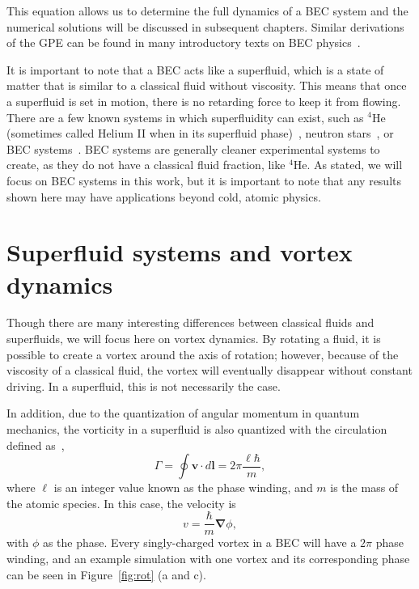 This equation allows us to determine the full dynamics of a BEC system and the numerical solutions will be discussed in subsequent chapters.
Similar derivations of the GPE can be found in many introductory texts on BEC physics~\cite{fetter2003, pethick2002, fetter2009}.

It is important to note that a BEC acts like a superfluid, which is a state of matter that is similar to a classical fluid without viscosity.
This means that once a superfluid is set in motion, there is no retarding force to keep it from flowing.
There are a few known systems in which superfluidity can exist, such as $^4$He (sometimes called Helium II when in its superfluid phase)~\cite{allen1938}, neutron stars~\cite{migdal1960}, or BEC systems~\cite{einstein1925, anderson1995}.
BEC systems are generally cleaner experimental systems to create, as they do not have a classical fluid fraction, like $^4$He.
As stated, we will focus on BEC systems in this work, but it is important to note that any results shown here may have applications beyond cold, atomic physics.

\section{Superfluid systems and vortex dynamics}

Though there are many interesting differences between classical fluids and superfluids, we will focus here on vortex dynamics.
By rotating a fluid, it is possible to create a vortex around the axis of rotation; however, because of the viscosity of a classical fluid, the vortex will eventually disappear without constant driving.
In a superfluid, this is not necessarily the case.

In addition, due to the quantization of angular momentum in quantum mechanics, the vorticity in a superfluid is also quantized with the circulation defined as~\cite{pethick2002},
\begin{equation}
\Gamma = \oint\mathbf{v} \cdot d \mathbf{l} = 2\pi \frac{\ell \hbar}{m},
\label{Eq:phase}
\end{equation}
where $\ell$ is an integer value known as the phase winding, and $m$ is the mass of the atomic species.
In this case, the velocity is
\begin{equation}
v = \frac{\hbar}{m}\mathbf{\nabla}\phi,
\end{equation}
with $\phi$ as the phase.
Every singly-charged vortex in a BEC will have a $2\pi$ phase winding, and an example simulation with one vortex and its corresponding phase can be seen in Figure~\ref{fig:rot} (a and c).

